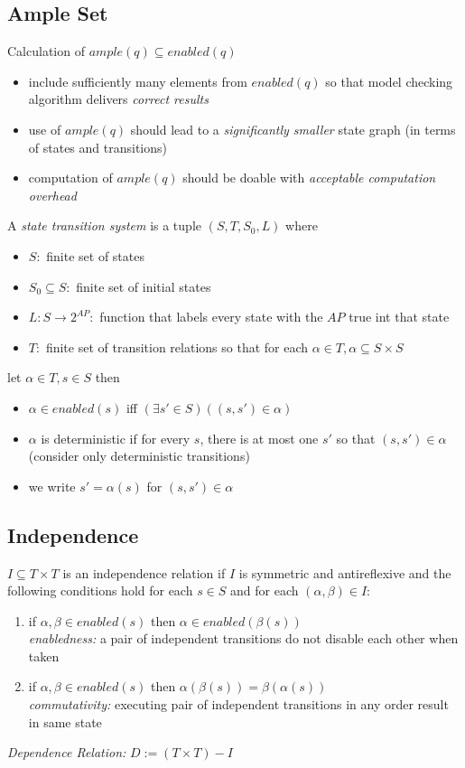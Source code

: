 \documentclass[a4paper, 10pt]{article}
\begin{document}
\subsection*{Ample Set}
Calculation of $ample(q)\subseteq enabled(q)$
\begin{itemize}
    \item include sufficiently many elements from $enabled(q)$ so that model checking algorithm delivers \emph{correct results}
    \item use of $ample(q)$ should lead to a \emph{significantly smaller} state graph (in terms of states and transitions)
    \item computation of $ample(q)$ should be doable with \emph{acceptable computation overhead}
\end{itemize}
\begin{shaded}
A \emph{state transition system} is a tuple $(S,T,S_0,L)$ where
\begin{itemize}
    \item $S:$ finite set of states
    \item $S_0\subseteq S:$ finite set of initial states
    \item $L:S\to2^{AP}:$ function that labels every state with the $AP$ true int that state
    \item $T:$ finite set of transition relations so that for each $\alpha\in T,\alpha\subseteq S\times S$
\end{itemize}
let $\alpha\in T, s\in S$ then
\begin{itemize}
    \item $\alpha\in enabled(s)$ iff $(\exists s'\in S)((s,s')\in\alpha)$
    \item $\alpha$ is deterministic if for every $s$, there is at most one $s'$ so that $(s,s')\in\alpha$ {\tiny (consider only deterministic transitions)}
    \item we write $s'=\alpha(s)$ for $(s,s')\in\alpha$
\end{itemize}
\end{shaded}
\subsection*{Independence}
\begin{shaded}
    $I\subseteq T\times T$ is an independence relation if $I$ is symmetric and antireflexive and the following conditions hold for each $s\in S$ and for each $(\alpha,\beta)\in I:$
    \begin{enumerate}
        \item if $\alpha,\beta\in enabled(s)$ then $\alpha\in enabled(\beta(s))$\\
        \emph{enabledness:} a pair of independent transitions do not disable each other when taken
        \item if $\alpha,\beta\in enabled(s)$ then $\alpha(\beta(s))=\beta(\alpha(s))$ \\
        \emph{commutativity:} executing pair of independent transitions in any order result in same state
    \end{enumerate}
    \emph{Dependence Relation:} $D:=(T\times T)-I$
\end{shaded}
\end{document}
